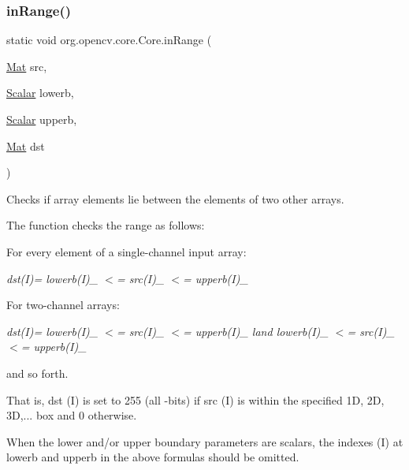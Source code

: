 \subsubsection{\texorpdfstring{in\+Range()}{inRange()}}
{\footnotesize\ttfamily static void org.\+opencv.\+core.\+Core.\+in\+Range (\begin{DoxyParamCaption}\item[{\mbox{\hyperlink{classorg_1_1opencv_1_1core_1_1_mat}{Mat}}}]{src,  }\item[{\mbox{\hyperlink{classorg_1_1opencv_1_1core_1_1_scalar}{Scalar}}}]{lowerb,  }\item[{\mbox{\hyperlink{classorg_1_1opencv_1_1core_1_1_scalar}{Scalar}}}]{upperb,  }\item[{\mbox{\hyperlink{classorg_1_1opencv_1_1core_1_1_mat}{Mat}}}]{dst }\end{DoxyParamCaption})\hspace{0.3cm}{\ttfamily [static]}}

Checks if array elements lie between the elements of two other arrays.

The function checks the range as follows\+:


\begin{DoxyItemize}
\item For every element of a single-\/channel input array\+: 
\end{DoxyItemize}

{\itshape dst(\+I)= lowerb(\+I)\+\_ $<$= src(\+I)\+\_ $<$= upperb(\+I)\+\_}


\begin{DoxyItemize}
\item For two-\/channel arrays\+: 
\end{DoxyItemize}

{\itshape dst(\+I)= lowerb(\+I)\+\_ $<$= src(\+I)\+\_ $<$= upperb(\+I)\+\_ land lowerb(\+I)\+\_ $<$= src(\+I)\+\_ $<$= upperb(\+I)\+\_}


\begin{DoxyItemize}
\item and so forth. 
\end{DoxyItemize}

That is, {\ttfamily dst} (I) is set to 255 (all {} -\/bits) if {\ttfamily src} (I) is within the specified 1D, 2D, 3D,... box and 0 otherwise.

When the lower and/or upper boundary parameters are scalars, the indexes {\ttfamily (I)} at {\ttfamily lowerb} and {\ttfamily upperb} in the above formulas should be omitted.


